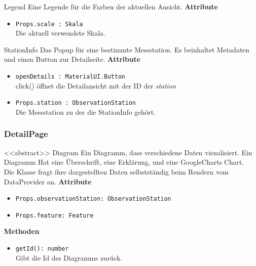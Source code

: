     \begin{Class}{Legend}
        Eine Legende für die Farben der aktuellen Ansicht.
        \textbf{Attribute}
        \begin{itemize}
            \item \texttt{Props.scale : Skala}
            \\ Die aktuell verwendete Skala.
        \end{itemize}
    \end{Class}
    
    \begin{Class}{StationInfo}
        Das Popup für eine bestimmte Messstation. Es beinhaltet Metadaten und einen Button zur Detailseite.
        \textbf{Attribute}
        \begin{itemize}
            \item \texttt{openDetails : MaterialUI.Button}
            \\ click() öffnet die Detailansicht mit der ID der \emph{station}
            \item \texttt{Props.station : ObservationStation}
            \\ Die Messstation zu der die StationInfo gehört.
        \end{itemize}
    \end{Class}

\subsubsection{DetailPage}
    \begin{Class}{<<abstract>> Diagram}
        Ein Diagramm, dass verschiedene Daten visualisiert. Ein Diagramm Hat eine Überschrift, eine Erklärung, und eine GoogleCharts Chart. Die Klasse fragt ihre dargestellten Daten selbstständig beim Rendern vom DataProvider an.
        \textbf{Attribute}
        \begin{itemize}
            \item \texttt{Props.observationStation: ObservationStation}
            \item \texttt{Props.feature: Feature}
        \end{itemize}
        \textbf{Methoden}
        \begin{itemize}
            \item \texttt{getId(): number}
            \\Gibt die Id des Diagramms zurück.
        \end{itemize}
        

    \end{Class}

